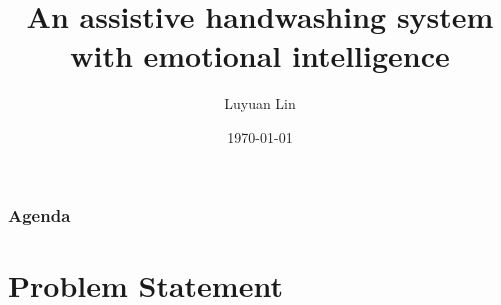 \documentclass{beamer}
\title[Master Thesis Presentation]{An assistive handwashing system with emotional intelligence}
\author{Luyuan Lin} %
\institute[UWaterloo] %
{
University of Waterloo \\ %
\medskip
\textit{Supervisor:
\newline Jesse Hoey
} %
}
\date{\today} %
\begin{document}
\begin{frame}
\titlepage %
\end{frame}

\begin{frame}
\frametitle{Agenda} %
\tableofcontents %
\end{frame}


\section{Problem Statement} 
\end{document}
